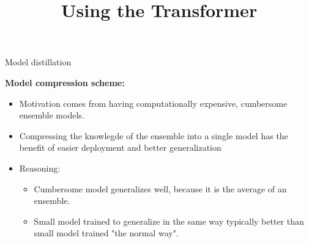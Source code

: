 



\newcommand{\titlefigure}{figure/sesamestreet.jpeg}
\newcommand{\learninggoals}{
\item Understand model distillation in general
\item Training regime of DistilBERT}

\title{Using the Transformer}
\date{}




\begin{frame}{Model distillation \href{https://arxiv.org/pdf/1503.02531.pdf}{}}

\vfill

\textbf{Model compression scheme:}

\begin{itemize}
	\item Motivation comes from having computationally expensive, cumbersome ensemble models. \href{http://www.niculescu-mizil.org/papers/rtpp364-bucila.rev2.pdf}{}
	\item Compressing the knowlegde of the ensemble into a single model has the benefit of easier deployment and better generalization
	\item Reasoning:
		\begin{itemize}
			\item Cumbersome model generalizes well, because it is the average of an ensemble.
			\item Small model trained to generalize in the same way typically better than small model trained "the normal way".
		\end{itemize}
\end{itemize}

\vfill

\end{frame}


